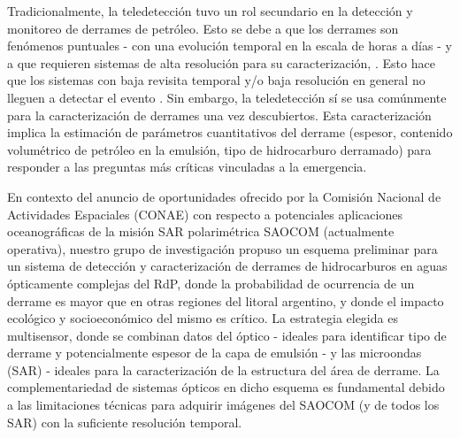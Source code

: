     Tradicionalmente, la teledetección tuvo un rol secundario en la detección y monitoreo de derrames de petróleo. Esto se debe a que los derrames son fenómenos puntuales - con una evolución temporal en la escala de horas a días - y a que requieren sistemas de alta resolución para su caracterización, \cite{hazmat1996}. Esto hace que los sistemas con baja revisita temporal y/o baja resolución en general no lleguen a detectar el evento \cite{brekke2005}. Sin embargo, la teledetección sí se usa comúnmente para la caracterización de derrames una vez descubiertos. Esta caracterización implica la estimación de parámetros cuantitativos del derrame (espesor, contenido volumétrico de petróleo en la emulsión, tipo de hidrocarburo derramado) para responder a las preguntas más críticas vinculadas a la emergencia.

    En contexto del anuncio de oportunidades ofrecido por la Comisión Nacional de Actividades Espaciales (CONAE) con respecto a potenciales aplicaciones oceanográficas de la misión SAR polarimétrica SAOCOM (actualmente operativa), nuestro grupo de investigación propuso un esquema preliminar para un sistema de detección y caracterización de derrames de hidrocarburos en aguas ópticamente complejas del RdP, donde la probabilidad de ocurrencia de un derrame es mayor que en otras regiones del litoral argentino, y donde el impacto ecológico y socioeconómico del mismo es crítico. La estrategia elegida es multisensor, donde se combinan datos del óptico - ideales para identificar tipo de derrame y potencialmente espesor de la capa de emulsión - y las microondas (SAR) - ideales para la caracterización de la estructura del área de derrame. La complementariedad de sistemas ópticos en dicho esquema es fundamental debido a las limitaciones técnicas para adquirir imágenes del SAOCOM (y de todos los SAR) con la suficiente resolución temporal.
    
